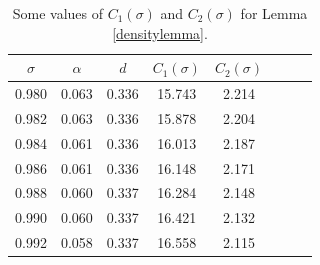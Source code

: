 \documentclass[reqno]{amsart}
\numberwithin{equation}{section}
\theoremstyle{remark}
\begin{document}
\def\arraystretch{1.5}
\begin{table}[h]
\centering
\caption{Some values of $C_1(\sigma)$ and $C_2(\sigma)$ for Lemma \ref{densitylemma}.}
\begin{tabular}{|c|c|c|c|c|c|c|c|}
\hline
$\sigma$ & $\alpha$ & $d$ & $C_1(\sigma)$ & $C_2(\sigma)$ \\
\hline
0.980 & 0.063 & 0.336 & 15.743 & 2.214 \\
\hline
0.982 & 0.063 & 0.336 & 15.878 & 2.204 \\
\hline
0.984 & 0.061 & 0.336 & 16.013 & 2.187 \\
\hline
0.986 & 0.061 & 0.336 & 16.148 & 2.171 \\
\hline
0.988 & 0.060 & 0.337 & 16.284 & 2.148 \\
\hline
0.990 & 0.060 & 0.337 & 16.421 & 2.132\\
\hline
0.992 & 0.058 & 0.337 & 16.558 & 2.115\\
\hline
\end{tabular}
\label{densitytable}
\end{table}
\end{document}
